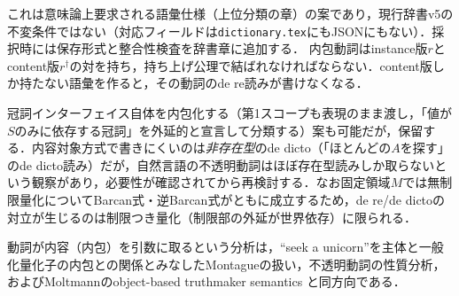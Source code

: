 \documentclass[../../main-detail.tex]{subfiles}
\begin{document}
\begin{remark}[辞書の不変条件（案）]
    これは意味論上要求される語彙仕様（上位分類の章）の案であり，現行辞書v5の不変条件ではない（対応フィールドは\texttt{dictionary.tex}にもJSONにもない）．採択時には保存形式と整合性検査を辞書章に追加する．
    内包動詞はinstance版$r$とcontent版$r^\dagger$の対を持ち，持ち上げ公理で結ばれなければならない．content版しか持たない語彙を作ると，その動詞のde re読みが書けなくなる．
\end{remark}
\begin{remark}[第1スコープの内包化は保留]
    冠詞インターフェイス自体を内包化する（第1スコープも表現のまま渡し，「値が$S$のみに依存する冠詞」を外延的と宣言して分類する）案も可能だが，保留する．内容対象方式で書きにくいのは\emph{非存在型}のde dicto（「ほとんどの$A$を探す」のde dicto読み）だが，自然言語の不透明動詞はほぼ存在型読みしか取らないという観察があり\cite{zimmermann-opacity}，必要性が確認されてから再検討する．なお固定領域$M$では無制限量化についてBarcan式・逆Barcan式がともに成立するため，de re/de dictoの対立が生じるのは制限つき量化（制限部の外延が世界依存）に限られる．
\end{remark}
\begin{remark}[Montague流との関係]
    動詞が内容（内包）を引数に取るという分析は，``seek a unicorn''を主体と一般化量化子の内包との関係とみなしたMontagueの扱い\cite{montague-ptq}，不透明動詞の性質分析\cite{zimmermann-opacity}，およびMoltmannのobject-based truthmaker semantics \cite{moltmann-attobj}と同方向である．
\end{remark}
\end{document}
